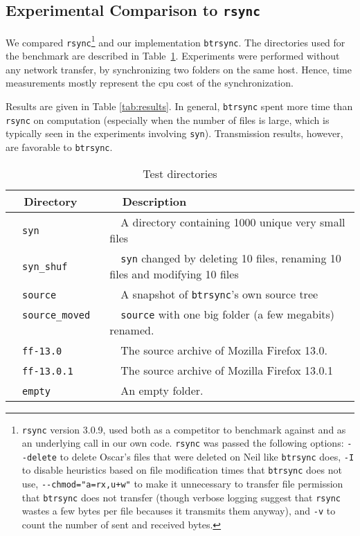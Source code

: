 \documentclass[twoside,envcountsame,runningheads]{llncs}
\newcommand{\btrsync}{\texttt{btrsync}\xspace}
\newcommand{\rsync}{\texttt{rsync}\xspace}
\begin{document}
\subsection{Experimental Comparison to \rsync}

We compared \rsync\footnote{\rsync version 3.0.9, used both as a competitor to
benchmark against and as an underlying call in our own code. \rsync was passed
the following options: {\tt {-}{-}delete} to delete Oscar's files that were
deleted on Neil like \btrsync does, {\tt -I} to disable heuristics based on file
modification times that \btrsync does not use, {\tt {-}{-}chmod="a=rx,u+w"} to make it unnecessary to
transfer file permission that \btrsync does not transfer (though verbose logging
suggest that \rsync wastes a few bytes per file becauses it transmits them
anyway), and {\tt -v} to count the number of sent and received bytes.} and our
implementation \btrsync. The directories used for the
benchmark are described in Table~\ref{tab:benchdirec}.
Experiments
were performed without any network transfer, by synchronizing two folders on
the same host. Hence, time measurements mostly represent the {\sc cpu} cost of
the synchronization.

Results are given in Table \ref{tab:results}. In general, \btrsync spent more time than \rsync on computation (especially when the number of files is large, which is typically seen in the experiments involving {\tt syn}). Transmission results, however, are favorable to \btrsync.

\begin{table}[t]
\centering
  \scriptsize
  \caption{Test directories}
  \label{tab:benchdirec}
\begin{tabular}{ll}\toprule
~~{\bf Directory}              ~~&~~{\bf Description}\\\midrule
~~{\tt syn}              ~~&~~A directory containing 1000 unique very small files\\
~~{\tt syn\_shuf}    ~~&~~{\tt syn} changed by deleting 10 files, renaming 10 files and modifying 10 files \\
~~{\tt source}                 ~~& ~~A snapshot of \btrsync's own source tree \\
~~{\tt source\_moved}          ~~& ~~{\tt source} with one big folder (a few megabits) renamed.~~\\
~~{\tt ff-13.0}           ~~& ~~The source archive of Mozilla Firefox 13.0.\\
~~{\tt ff-13.0.1}         ~~& ~~The source archive of Mozilla Firefox 13.0.1\\
~~{\tt empty}                  ~~& ~~An empty folder.\\\bottomrule
\end{tabular}\smallskip
\end{table}
\end{document}
